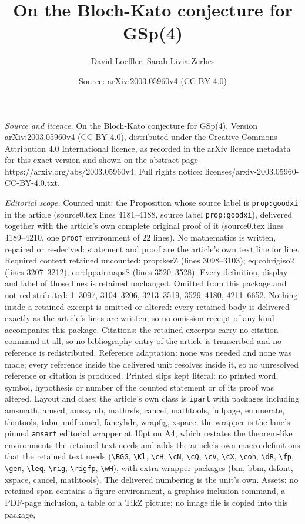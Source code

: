 \documentclass[10pt,a4paper]{amsart}
\title[On the Bloch-Kato conjecture for GSp(4)]{On the Bloch-Kato conjecture for GSp(4)}
\author{David Loeffler, Sarah Livia Zerbes}
\date{Source: arXiv:2003.05960v4 (CC BY 4.0)}
\begin{document}
\maketitle

\noindent\emph{Source and licence.} On the Bloch-Kato conjecture for GSp(4). Version arXiv:2003.05960v4 (CC BY 4.0), distributed under the Creative Commons Attribution 4.0 International licence, as recorded in the arXiv licence metadata for this exact version and shown on the abstract page https://arxiv.org/abs/2003.05960v4. Full rights notice: licenses/arxiv-2003.05960-CC-BY-4.0.txt.\par\smallskip

\noindent\textit{Editorial scope.} Counted unit: the Proposition whose source label is \texttt{prop:goodxi} in the article (source0.tex lines 4181--4188, source label \texttt{prop:goodxi}), delivered together with the article's own complete original proof of it (source0.tex lines 4189--4210, one \texttt{proof} environment of 22 lines). No mathematics is written, repaired or re-derived: statement and proof are the article's own text line for line. Required context retained uncounted: prop:kerZ (lines 3098--3103); eq:cohrigiso2 (lines 3207--3212); cor:fppairmapsS (lines 3520--3528). Every definition, display and label of those lines is retained unchanged. Omitted from this package and not redistributed: 1--3097, 3104--3206, 3213--3519, 3529--4180, 4211--6652. Nothing inside a retained excerpt is omitted or altered: every retained body is delivered exactly as the article's lines are written, so no omission receipt of any kind accompanies this package. Citations: the retained excerpts carry no citation command at all, so no bibliography entry of the article is transcribed and no reference is redistributed. Reference adaptation: none was needed and none was made; every reference inside the delivered unit resolves inside it, so no unresolved reference or citation is produced. Printed slips kept literal: no printed word, symbol, hypothesis or number of the counted statement or of its proof was altered. Layout and class: the article's own class is \texttt{ipart} with packages including amsmath, amscd, amssymb, mathrsfs, cancel, mathtools, fullpage, enumerate, thmtools, tabu, mdframed, fancyhdr, wrapfig, xspace; the wrapper is the lane's pinned \texttt{amsart} editorial wrapper at 10pt on A4, which restates the theorem-like environments the retained text needs and adds the article's own macro definitions that the retained text needs (\texttt{\textbackslash BGG}, \texttt{\textbackslash Kl}, \texttt{\textbackslash cH}, \texttt{\textbackslash cN}, \texttt{\textbackslash cQ}, \texttt{\textbackslash cV}, \texttt{\textbackslash cX}, \texttt{\textbackslash coh}, \texttt{\textbackslash dR}, \texttt{\textbackslash fp}, \texttt{\textbackslash gen}, \texttt{\textbackslash leq}, \texttt{\textbackslash rig}, \texttt{\textbackslash rigfp}, \texttt{\textbackslash wH}), with extra wrapper packages (bm, bbm, dsfont, xspace, cancel, mathtools). The delivered numbering is the unit's own. Assets: no retained span contains a figure environment, a graphics-inclusion command, a PDF-page inclusion, a table or a TikZ picture; no image file is copied into this package, 
\end{document}
